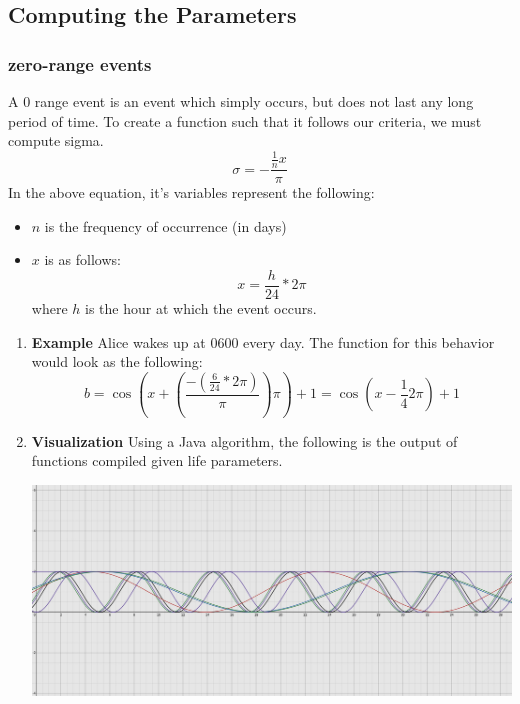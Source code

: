 \documentclass[11pt]{article}
\begin{document}
\subsection{Computing the Parameters}
\label{sec:orgbe29fa8}
\subsubsection{zero-range events}
\label{sec:orgaf096b9}
A 0 range event is an event which simply occurs, but does not last any long period of time. To create a function such that it follows our criteria, we must compute sigma.
\begin{equation}
    \sigma = -\frac{\frac{1}{n}x}{\pi}
\end{equation}
In the above equation, it's variables represent the following:
\begin{itemize}
\item \(n\) is the frequency of occurrence (in days)
\item \(x\) is as follows:
\begin{equation}
  x = \frac{h}{24} * 2\pi
\end{equation}
where \(h\) is the hour at which the event occurs.
\end{itemize}
\begin{enumerate}
\item \textbf{Example}
\label{sec:org12f3c5b}
Alice wakes up at 0600 every day. The function for this behavior would look as the following:
\begin{equation}
b = \cos{( x + (\frac{-(\frac{6}{24}*2\pi)}{\pi})\pi )} + 1 = \cos{(x-\frac{1}{4}2\pi)}+1
\end{equation}
\item \textbf{Visualization}
\label{sec:orge7643a4}
Using a Java algorithm, the following is the output of functions compiled given life parameters.
\begin{center}
\includegraphics[width=.9\linewidth]{./media/life01.jpg}
\end{center}
\end{enumerate}
\end{document}
